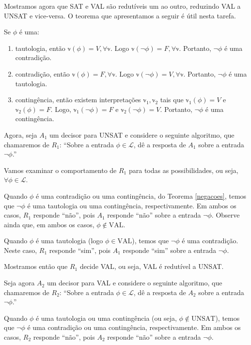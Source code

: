 Mostramos agora que SAT e VAL são redutíveis um ao outro, reduzindo VAL a UNSAT e vice-versa. O teorema que apresentamos a seguir é útil nesta tarefa.

\begin{theorem}
	\label{negacoes}
	Se $\phi$ é uma:
	\begin{enumerate}
		\item tautologia, então $\mathbb{v}(\phi) = V, \forall \mathbb{v}$. Logo $\mathbb{v}(\neg \phi) = F, \forall \mathbb{v}$. Portanto, $\neg \phi$ é uma contradição.
		\item contradição, então $\mathbb{v}(\phi) = F, \forall \mathbb{v}$. Logo $\mathbb{v}(\neg \phi) = V, \forall \mathbb{v}$. Portanto, $\neg \phi$ é uma tautologia.
		\item contingência, então existem interpretações $\mathbb{v}_1,\mathbb{v}_2$ tais que $\mathbb{v}_1(\phi) = V$ e $\mathbb{v}_2(\phi) = F$. Logo, $\mathbb{v}_1(\neg \phi) = F$ e $\mathbb{v}_2(\neg \phi) = V$. Portanto, $\neg \phi$ é uma contingência.
	\end{enumerate}
\end{theorem}

Agora, seja $A_1$ um decisor para UNSAT e considere o seguinte algoritmo, que chamaremos de $R_1$: ``Sobre a entrada $\phi \in \mathcal{L}$, dê a resposta de $A_1$ sobre a entrada $\neg \phi$.''

Vamos examinar o comportamento de $R_1$ para todas as possibilidades, ou seja, $\forall \phi \in \mathcal{L}$.

Quando $\phi$ é uma contradição ou uma contingência, do Teorema \ref{negacoes}, temos que $\neg \phi$ é uma tautologia ou uma contingência, respectivamente. Em ambos os casos, $R_1$ responde ``não'', pois $A_1$ responde ``não'' sobre a entrada $\neg \phi$. Observe ainda que, em ambos os casos, $\phi \notin \text{VAL}$.

Quando $\phi$ é uma tautologia (logo $\phi \in \text{VAL}$), temos que $\neg \phi$ é uma contradição. Neste caso, $R_1$ responde ``sim'', pois $A_1$ responde ``sim'' sobre a entrada $\neg \phi$.

Mostramos então que $R_1$ decide VAL, ou seja, VAL é redutível a UNSAT.

Seja agora $A_2$ um decisor para VAL e considere o seguinte algoritmo, que chamaremos de $R_2$: ``Sobre a entrada $\phi \in \mathcal{L}$, dê a resposta de $A_2$ sobre a entrada $\neg \phi$.''

Quando $\phi$ é uma tautologia ou uma contingência (ou seja, $\phi \notin \text{UNSAT}$), temos que $\neg \phi$ é uma contradição ou uma contingência, respectivamente. Em ambos os casos, $R_2$ responde ``não'', pois $A_2$ responde ``não'' sobre a entrada $\neg \phi$.

